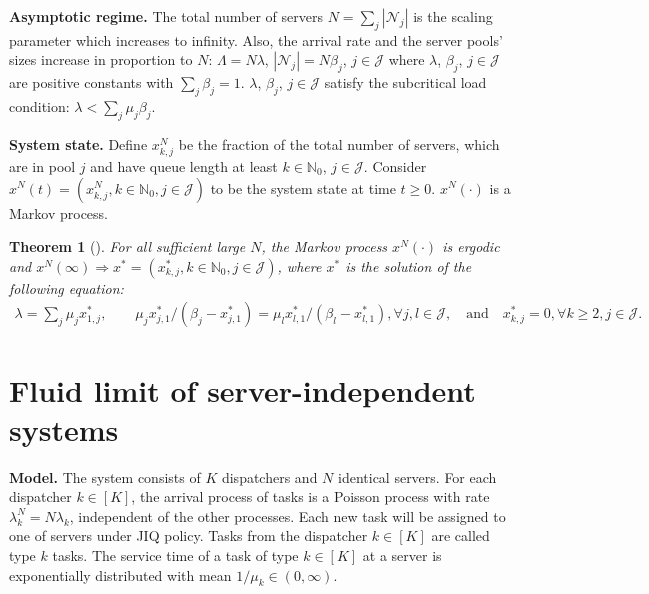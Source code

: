\documentclass[11pt, reqno]{article}
\newtheorem{theorem}{Theorem}
\numberwithin{equation}{section}
\numberwithin{theorem}{section}
\newcommand{\N}{\mathbb{N}}                 %
\begin{document}
\noindent
\textbf{Asymptotic regime.} The total number of servers $N=\sum_{j}|\mathcal{N}_j|$ is the scaling parameter which increases to infinity. Also, the arrival rate and the server pools' sizes increase in proportion to $N$: $\Lambda=N\lambda$, $|\mathcal{N}_j|=N\beta_j$, $j\in\mathcal{J}$ where $\lambda$, $\beta_j$, $j\in\mathcal{J}$ are positive constants with $\sum_{j}\beta_j=1$. $\lambda$, $\beta_j$, $j\in\mathcal{J}$ satisfy the subcritical load condition: $\lambda<\sum_j \mu_j\beta_j$.
\vspace{3mm}

\noindent
\textbf{System state.} Define $x^N_{k,j}$ be the fraction of the total number of servers, which are in pool $j$ and have queue length at least $k\in \N_0$, $j\in\mathcal{J}$. Consider $x^N(t)=(x^N_{k,j}, k\in\N_0, j\in\mathcal{J})$ to be the system state at time $t\geq 0$. $x^N(\cdot)$ is a Markov process.
\begin{theorem}[{\cite[Theorem~2]{AS15}}]
\label{thm:AS15}
For all sufficient large $N$, the Markov process $x^N(\cdot)$ is ergodic and $x^N(\infty)\Rightarrow x^*=(x^*_{k,j},k\in\N_0,j\in\mathcal{J})$, where $x^*$ is the solution of the following equation:
\begin{equation*}
    \begin{split}
        \lambda=\sum_j\mu_jx^*_{1,j},\qquad
        \mu_jx^*_{j,1}/(\beta_j-x^*_{j,1})=\mu_lx^*_{l,1}/(\beta_l-x^*_{l,1}), \forall j,l\in\mathcal{J},\quad\text{and}\quad 
        x^*_{k,j}=0,\forall k\geq 2, j\in\mathcal{J}.
    \end{split}
\end{equation*}
\end{theorem}


\section{Fluid limit of server-independent systems}\label{app:server-independent-fluid}
\noindent
\textbf{Model.} The system consists of $K$ dispatchers and $N$ identical servers. For each dispatcher $k\in[K]$, the arrival process of tasks is a Poisson process with rate $\lambda^N_k=N\lambda_k$, independent of the other processes. Each new task will be assigned to one of servers under JIQ policy. Tasks from the dispatcher $k\in[K]$ are called type $k$ tasks. The service time of a task of type $k\in[K]$ at a server is exponentially distributed with mean $1/\mu_{k}\in(0,\infty)$.
\vspace{3mm}
\end{document}
